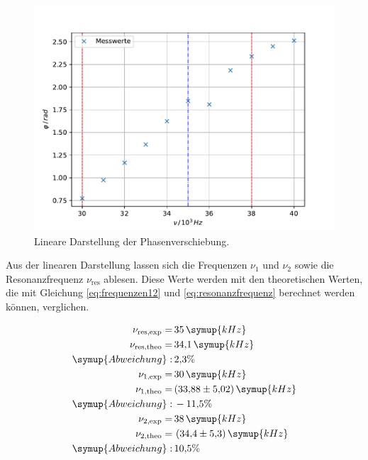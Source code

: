 \begin{figure}[h!]
	\centering
	\includegraphics[width=0.7\linewidth]{phasenverschiebung.pdf}
	\caption{Lineare Darstellung der Phasenverschiebung.}
	\label{fig:phasenverschiebunglinear}
\end{figure}
Aus der linearen Darstellung lassen sich die Frequenzen $\nu_1$ und $\nu_2$ sowie die Resonanzfrequenz $\nu_{\text{res}}$ ablesen. Diese Werte werden mit den theoretischen Werten, die mit Gleichung \eqref{eq:frequenzen12}
und \eqref{eq:resonanzfrequenz} berechnet werden können, verglichen. 

\begin{equation*}
\begin{aligned} 
\nu_{\text{res,exp}} =& \, 35\,\symup{kHz} \\
\nu_{\text{res,theo}} =& \, 34{,}1\,\symup{kHz} \\
            \symup{Abweichung}:& \,  2{,}3\% \\
\nu_{\text{1,exp}} =& \, 30\,\symup{kHz} \\
\nu_{\text{1,theo}} =& \, (33{,}88 \pm 5{,}02)\,\symup{kHz}\\
\symup{Abweichung}:& \, -11{,}5\%\\
\nu_{\text{2,exp}} =& \, 38\,\symup{kHz} \\
\nu_{\text{2,theo}} =& \ (34{,}4 \pm 5{,}3)\,\symup{kHz}\\
\symup{Abweichung}:& \, 10{,}5\%\\
\end{aligned}
\end{equation*}